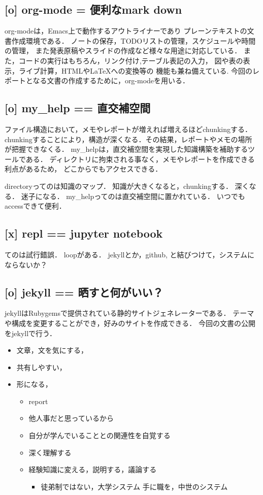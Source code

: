 \documentclass{jsarticle}
\begin{document}
\subsection{[o] org-mode = 便利なmark down}
\label{sec:org7a09597}
org-modeは，Emacs上で動作するアウトライナーであり
プレーンテキストの文書作成環境である．
ノートの保存，TODOリストの管理，スケジュールや時間の管理，
また発表原稿やスライドの作成など様々な用途に対応している．
また，コードの実行はもちろん，リンク付け,テーブル表記の入力，
図や表の表示，ライブ計算，HTMLや\LaTeX{}への変換等の
機能も兼ね備えている.
今回のレポートとなる文書の作成するために，org-modeを用いる．

\subsection{[o] my\_help == 直交補空間}
\label{sec:orge3b3b9c}
ファイル構造において，メモやレポートが増えれば増えるほどchunkingする．
chunkingすることにより，構造が深くなる．その結果，レポートやメモの場所
が把握できなくる．
my\_helpは，直交補空間を実現した知識構築を補助するツールである．
ディレクトリに拘束される事なく，メモやレポートを作成できる利点があるため，
どこからでもアクセスできる．

directoryってのは知識のマップ．
知識が大きくなると，chunkingする．
深くなる．
迷子になる．
my\_helpってのは直交補空間に置かれている．
いつでもaccessできて便利．

\subsection{[x] repl == jupyter notebook}
\label{sec:orgf32f313}
てのは試行錯誤．
loopがある．
jekyllとか，github, と結びつけて，システムにならないか？

\subsection{[o] jekyll == 晒すと何がいい？}
\label{sec:org201f13b}
jekyllはRubygemsで提供されている静的サイトジェネレーターである．
テーマや構成を変更することができ，好みのサイトを作成できる．
今回の文書の公開をjekyllで行う．
\begin{itemize}
\item 文章，文を気にする，
\item 共有しやすい，
\item 形になる，
\begin{itemize}
\item report
\item 他人事だと思っているから
\item 自分が学んでいることとの関連性を自覚する
\item 深く理解する
\item 経験知識に変える，説明する，議論する
\begin{itemize}
\item 徒弟制ではない，大学システム
手に職を，中世のシステム
\end{itemize}
\end{itemize}
\end{itemize}
\end{document}
